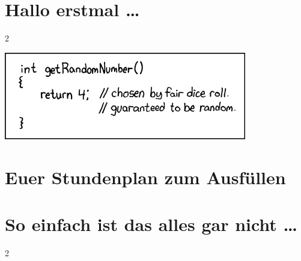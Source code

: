 \documentclass[a4paper,12pt]{scrartcl}
\newcommand{\spaltenanfang}{\begin{multicols}{2}}
\newcommand{\spaltenende}{\end{multicols}}
\begin{document}


{
\small
\tableofcontents
}

\newpage

\newpage


\section{Hallo erstmal …}

\spaltenanfang

\spaltenende

\vspace{10mm}
\begin{center}
\includegraphics[scale=1.0]{comics/random_number}
\end{center}

%
%


\newpage
\section{Euer Stundenplan zum Ausfüllen}




\newpage
\section{So einfach ist das alles gar nicht \dots}
\spaltenanfang

\spaltenende

\vspace{8mm}

\begin{center}
\end{center}


\end{document}

